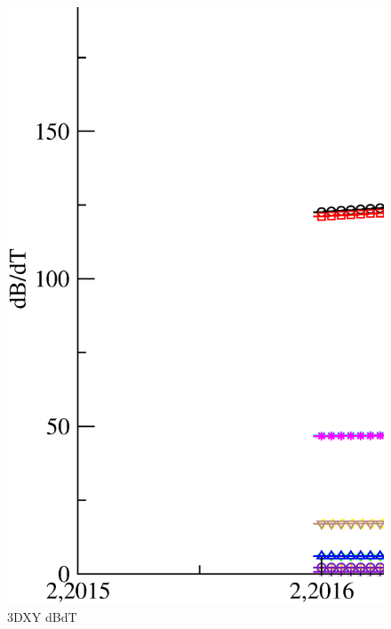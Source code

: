 \begin{figure}[!htpb]
  \centering
  \includegraphics[width=\textwidth]{./plots/3DXY/vsT/dBdT.eps}
  \caption{3DXY dBdT}
\end{figure}

